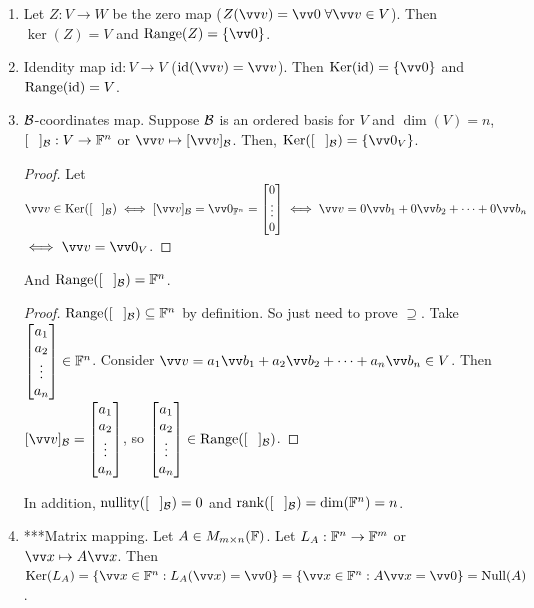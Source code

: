 \begin{example}
    \phantom{}
    \begin{enumerate}
        \item Let $Z:V\to W$ be the zero map ($Z(\vvv) = \vzero \; \forall \vvv \in V$). Then $\ker(Z) = V$ and $\range(Z) = \{\vzero\}$.
        \item Idendity map $\text{id}:V \to V$ ($\operatorname{id}(\vvv) = \vvv$). Then $\ker(\text{id}) = \{\vzero\}$ and $\operatorname{Range}(\text{id}) = V$.
        \item $\mathcal{B}$-coordinates map. Suppose $\mathcal{B}$ is an ordered basis for $V$ and $\dim(V) = n$, $[\phantom{A}]_{\mathcal{B}}:V \to {\mathbb{F}}^n$ or $\vvv \mapsto [\vvv]_{\mB}$.
        Then, $\ker([\phantom{A}]_{\mB}) = \left\{ \vzero_V \right\}$. \vspace{-3mm}
        \begin{proof}
            Let $\vvv \in \ker([\phantom{A}]_{\mB}) \iff [\vvv]_{\mB} = \vzero_{\F^n} = \cv{0 \\ \vdots \\ 0} \iff \vvv = 0\vvb_1 + 0\vvb_2 + \cdots + 0\vvb_n$ 
            $\iff \vvv = \vzero_V$.
        \end{proof}

        And $\operatorname{Range}([\phantom{A}]_{\mathcal{B}}) = {\mathbb{F}}^n$. \vspace{-3mm}
        \begin{proof}
            $\operatorname{Range}([\phantom{A}]_{\mathcal{B}}) \subseteq {\mathbb{F}}^n$ by definition. So just need to prove $\supseteq$. Take $\begin{bmatrix} a_1 \\ a_2 \\ \vdots \\ a_n \end{bmatrix} \in {\mathbb{F}}^n$.
            Consider $\vvv = a_1\vvb_1 + a_2\vvb_2 + \cdots + a_n\vvb_n \in V$. Then $[\vvv]_{\mB} = \cv{a_1 \\ a_2 \\ \vdots \\ a_n}$, so $\begin{bmatrix} a_1 \\ a_2 \\ \vdots \\ a_n \end{bmatrix} \in \operatorname{Range}([\phantom{A}]_{\mathcal{B}})$.
        \end{proof}

        In addition, $\operatorname{nullity}([\phantom{A}]_{\mathcal{B}}) = 0$ and $\operatorname{rank}([\phantom{A}]_{\mathcal{B}}) = \dim({\mathbb{F}}^n) = n$.
        \item ***Matrix mapping. Let $A \in M_{m \times n}({\mathbb{F}})$. Let $L_A:{\mathbb{F}}^n \to {\mathbb{F}}^m$ or $\vx \mapsto A\vx$. Then $\ker(L_A) = \left\{ \vx \in \F^n: L_A(\vx) = \vzero \right\} = \left\{ \vx \in \F^n: A\vx = \vzero \right\} = \nul(A)$.
        

\end{enumerate}
\end{example}
